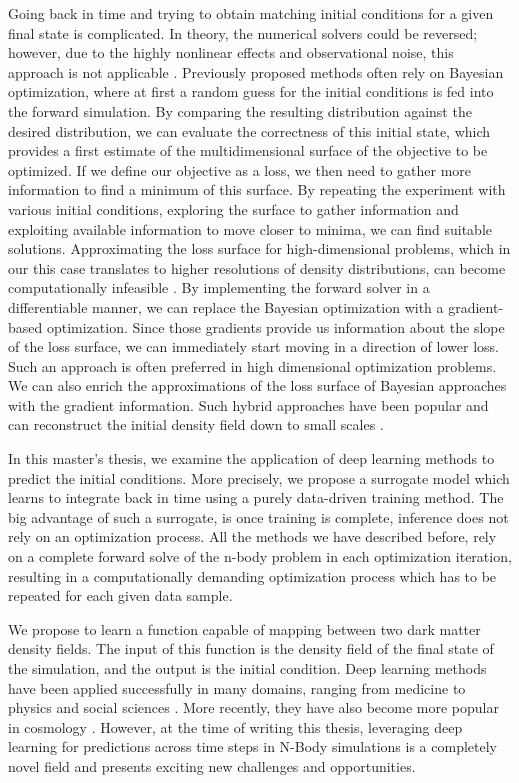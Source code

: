 \documentclass{article}
\begin{document}
Going back in time and trying to obtain matching initial conditions for a given final state is complicated. In theory, the numerical solvers could be reversed; however, due to the highly nonlinear effects and observational noise, this approach is not applicable \citep{jasche2013bayesian}. Previously proposed methods often rely on Bayesian optimization, where at first a random guess for the initial conditions is fed into the forward simulation. By comparing the resulting distribution against the desired distribution, we can evaluate the correctness of this initial state, which provides a first estimate of the multidimensional surface of the objective to be optimized. If we define our objective as a loss, we then need to gather more information to find a minimum of this surface. By repeating the experiment with various initial conditions, exploring the surface to gather information and exploiting available information to move closer to minima, we can find suitable solutions. Approximating the loss surface for high-dimensional problems, which in our this case translates to higher resolutions of density distributions, can become computationally infeasible \citep{djolonga2013high}. By implementing the forward solver in a differentiable manner, we can replace the Bayesian optimization with a gradient-based optimization. Since those gradients provide us information about the slope of the loss surface, we can immediately start moving in a direction of lower loss. Such an approach is often preferred in high dimensional optimization problems. We can also enrich the approximations of the loss surface of Bayesian approaches with the gradient information. Such hybrid approaches have been popular and can reconstruct the initial density field down to small scales \citep{wang2014elucid}.

In this master’s thesis, we examine the application of deep learning methods to predict the initial conditions. More precisely, we propose a surrogate model which learns to integrate back in time using a purely data-driven training method. The big advantage of such a surrogate, is once training is complete, inference does not rely on an optimization process. All the methods we have described before, rely on a complete forward solve of the n-body problem in each optimization iteration, resulting in a computationally demanding optimization process which has to be repeated for each given data sample.

We propose to learn a function capable of mapping between two dark matter density fields. The input of this function is the density field of the final state of the simulation, and the output is the initial condition. Deep learning methods have been applied successfully in many domains, ranging from medicine \citep{wang2019deep} to physics \citep{thuerey2021physics} and social sciences \citep{orabi2018deep}. More recently, they have also become more popular in cosmology \citep{escamilla2020deep, mathuriya2018cosmoflow, bernardini2022ember}. However, at the time of writing this thesis, leveraging deep learning for predictions across time steps in N-Body simulations is a completely novel field and presents exciting new challenges and opportunities.
\end{document}
